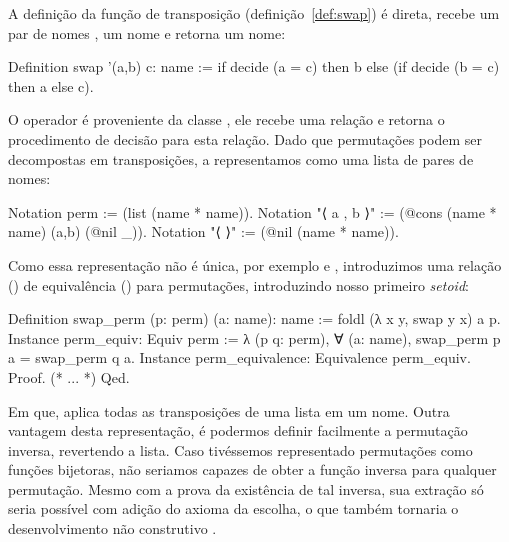 A definição da função de transposição (definição~\ref{def:swap}) é direta, recebe um par de nomes , um nome  e retorna um nome:
\begin{coqcode}
Definition swap '(a,b) c: name :=
   if decide (a = c) then b else (if decide (b = c) then a else c).
\end{coqcode}
O operador  é proveniente da classe , ele recebe uma relação e retorna o procedimento de decisão para esta relação. 
Dado que permutações podem ser decompostas em transposições, a representamos como uma lista de pares de nomes:
\begin{coqcode}
Notation perm := (list (name * name)).
Notation "⟨ a , b ⟩" := (@cons (name * name) (a,b) (@nil _)).
Notation "⟨ ⟩" := (@nil (name * name)).
\end{coqcode}
Como essa representação não é única, por exemplo  e , introduzimos uma relação () de equivalência () para permutações, introduzindo nosso primeiro \textit{setoid}:
\begin{coqcode}
Definition swap_perm (p: perm) (a: name): name :=
   foldl (λ x y, swap y x) a p.
Instance perm_equiv: Equiv perm :=
   λ (p q: perm), ∀ (a: name), swap_perm p a = swap_perm q a.
Instance perm_equivalence: Equivalence perm_equiv. Proof. (* ... *) Qed.
\end{coqcode}
Em que,  aplica todas as transposições de uma lista em um nome. Outra vantagem desta representação, é podermos definir facilmente a permutação inversa, revertendo a lista. Caso tivéssemos representado permutações como funções bijetoras, não seriamos capazes de obter a função inversa para qualquer permutação. Mesmo com a prova da existência de tal inversa, sua extração só seria possível com adição do axioma da escolha, o que também tornaria o desenvolvimento não construtivo .


